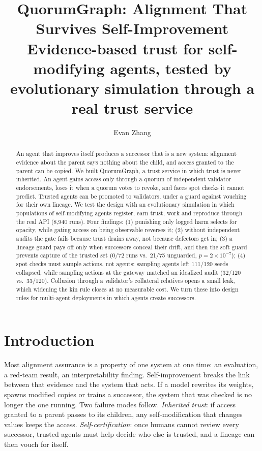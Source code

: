 \documentclass[11pt]{article}
\title{QuorumGraph: Alignment That Survives Self-Improvement\\[4pt]
\large Evidence-based trust for self-modifying agents, tested by evolutionary simulation through a real trust service}
\author{Evan Zhang\\ \todo{affiliation}}
\date{}
\begin{document}
\maketitle

\begin{abstract}
An agent that improves itself produces a successor that is a new system: alignment evidence
about the parent says nothing about the child, and access granted to the parent can be
copied. We built QuorumGraph, a trust service in which trust is never inherited. An agent
gains access only through a quorum of independent validator endorsements, loses it when a
quorum votes to revoke, and faces spot checks it cannot predict. Trusted agents can be
promoted to validators, under a guard against vouching for their own lineage. We test the
design with an evolutionary simulation in which populations of self-modifying agents
register, earn trust, work and reproduce through the real API (8{,}940 runs). Four findings:
(1) punishing only logged harm selects for opacity, while gating access on being observable
reverses it; (2) without independent audits the gate fails because trust drains away, not
because defectors get in; (3) a lineage guard pays off only when successors conceal their
drift, and then the soft guard prevents capture of the trusted set (0/72 runs vs.\ 21/75
unguarded, $p = 2\times10^{-7}$); (4) spot checks must sample actions, not agents: sampling
agents left 111/120 seeds collapsed, while sampling actions at the gateway matched an
idealized audit (32/120 vs.\ 33/120). Collusion through a validator's collateral relatives
opens a small leak, which widening the kin rule closes at no measurable cost. We turn these
into design rules for multi-agent deployments in which agents create successors.
\end{abstract}

\section{Introduction}

Most alignment assurance is a property of one system at one time: an evaluation, a red-team
result, an interpretability finding. Self-improvement breaks the link between that evidence
and the system that acts. If a model rewrites its weights, spawns modified copies or trains a
successor, the system that was checked is no longer the one running. Two failure modes
follow. \emph{Inherited trust}: if access granted to a parent passes to its children, any
self-modification that changes values keeps the access. \emph{Self-certification}: once
humans cannot review every successor, trusted agents must help decide who else is trusted,
and a lineage can then vouch for itself.
\end{document}
